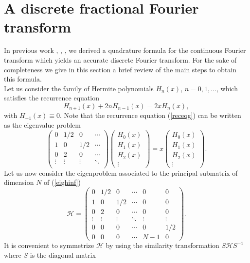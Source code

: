 \documentclass[12pt]{article}
\begin{document}
\section{A discrete fractional Fourier transform}\label{secdos}
In previous work \cite{Cam92}, \cite{Cam95}, \cite{Cam08},  we derived a quadrature formula for the continuous Fourier transform which yields an accurate discrete Fourier transform. For the sake of completeness we give in this section a brief review of the main steps to obtain this formula.\\
Let us consider the family of Hermite polynomials $H_n(x)$, $n=0,1,\ldots$, which satisfies the recurrence equation 
\begin{equation}\label{receqg}
H_{n+1}(x)+2nH_{n-1}(x)=2xH_n(x),
\end{equation}
with $H_{-1}(x)\equiv 0$. 
Note that the recurrence equation (\ref{receqg}) can be written as the eigenvalue problem 
\begin{equation}\label{eighinf}
\begin{pmatrix} 0&1/2&0&\cdots \\1&0& 1/2&\cdots \\0& 2& 0&\cdots \\\vdots&\vdots&\vdots&\ddots\\ \end{pmatrix}
\begin{pmatrix} H_0(x)\\  H_1(x)\\  H_2(x)\\ \vdots\end{pmatrix}=x\begin{pmatrix} H_0(x)\\  H_1(x)\\  H_2(x)\\ \vdots\end{pmatrix}.
\end{equation}
Let us now consider the eigenproblem associated to the principal submatrix of dimension $N$ of (\ref{eighinf})
\[
{\mathcal H}=\begin{pmatrix}0&1/2&0&\cdots & 0& 0\\1& 0& 1/2&\cdots & 0& 0\\0& 2& 0&\cdots &  0& 0\\
\vdots&\vdots&\vdots&\ddots&\vdots&\vdots\\
0& 0& 0&\cdots & 0&1/2\\0& 0& 0&\cdots & N-1&0\end{pmatrix}.
\]
It is convenient to symmetrize ${\mathcal H}$ by using the similarity transformation $S{\mathcal H} S^{-1}$ where $S$ is the diagonal matrix 
\end{document}
